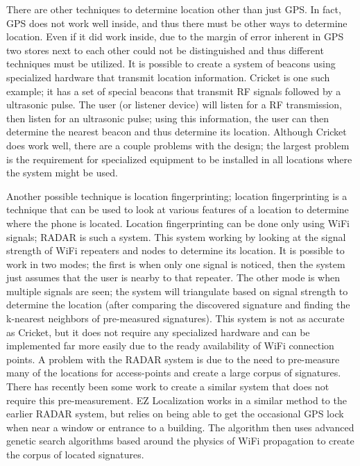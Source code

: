 \documentclass{acm_proc_article-sp}
\begin{document}
There are other techniques to determine location other than just GPS.  In fact, GPS does not work well inside, and thus there must be other ways to determine location.  Even if it did work inside, due to the margin of error inherent in GPS two stores next to each other could not be distinguished and thus different techniques must be utilized. It is possible to create a system of beacons using specialized hardware that transmit location information.  Cricket is one such example; it has a set of special beacons that transmit RF signals followed by a ultrasonic pulse.  The user (or listener device) will listen for a RF transmission, then listen for an ultrasonic pulse; using this information, the user can then determine the nearest beacon and thus determine its location.  Although Cricket does work well, there are a couple problems with the design; the largest problem is the requirement for specialized equipment to be installed in all locations where the system might be used. \cite{priyantha2000cricket}  

Another possible technique is location fingerprinting; location fingerprinting is a technique that can be used to look at various features of a location to determine where the phone is located. Location fingerprinting can be done only using WiFi signals; RADAR \cite{bahl2000radar} is such a system.  This system working by looking at the signal strength of WiFi repeaters and nodes to determine its location. It is possible to work in two modes; the first is when only one signal is noticed, then the system just assumes that the user is nearby to that repeater.  The other mode is when multiple signals are seen; the system will triangulate based on signal strength to determine the location (after comparing the discovered signature and finding the k-nearest neighbors of pre-measured signatures).  This system is not as accurate as Cricket, but it does not require any specialized hardware and can be implemented far more easily due to the ready availability of WiFi connection points.  \cite{bahl2000radar}  A problem with the RADAR system is due to the need to pre-measure many of the locations for access-points and create a large corpus of signatures. There has recently been some work to create a similar system that does not require this pre-measurement.  EZ Localization works in a similar method to the earlier RADAR system, but relies on being able to get the occasional GPS lock when near a window or entrance to a building. The algorithm then uses advanced genetic search algorithms based around the physics of WiFi propagation to create the corpus of located signatures.  \cite{chintalapudi2010indoor}
\end{document}
